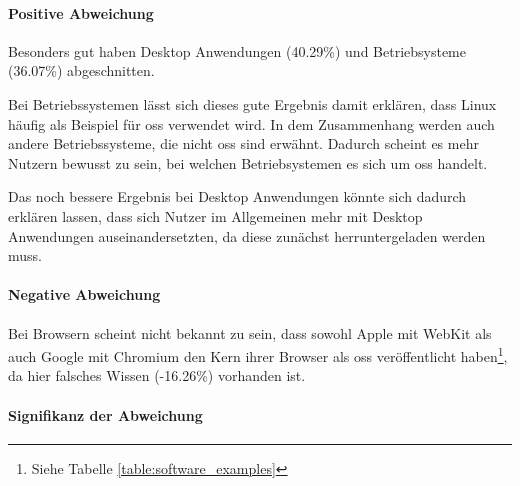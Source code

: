 \documentclass[a4paper]{article}
\begin{document}
                \paragraph{Positive Abweichung}
                    Besonders gut haben Desktop Anwendungen ({\scriptsize 40.29\%}) und Betriebsysteme ({\scriptsize 36.07\%}) abgeschnitten.
                    
                    Bei Betriebssystemen lässt sich dieses gute Ergebnis damit erklären, dass Linux häufig als Beispiel für \gls{oss} verwendet wird. In dem Zusammenhang werden auch andere Betriebssysteme, die nicht \gls{oss} sind erwähnt. Dadurch scheint es mehr Nutzern bewusst zu sein, bei welchen Betriebsystemen es sich um \gls{oss} handelt.
                    
                    Das noch bessere Ergebnis bei Desktop Anwendungen könnte sich dadurch erklären lassen, dass sich Nutzer im Allgemeinen mehr mit Desktop Anwendungen auseinandersetzten, da diese zunächst herruntergeladen werden muss.
                
                \paragraph{Negative Abweichung}
                    Bei Browsern scheint nicht bekannt zu sein, dass sowohl Apple mit WebKit als auch Google mit Chromium den Kern ihrer Browser als \gls{oss} veröffentlicht haben\footnote{Siehe Tabelle \ref{table:software_examples}}, da hier falsches Wissen ({\scriptsize -16.26\%}) vorhanden ist. 
                    
                \paragraph{Signifikanz der Abweichung}
                
\end{document}

